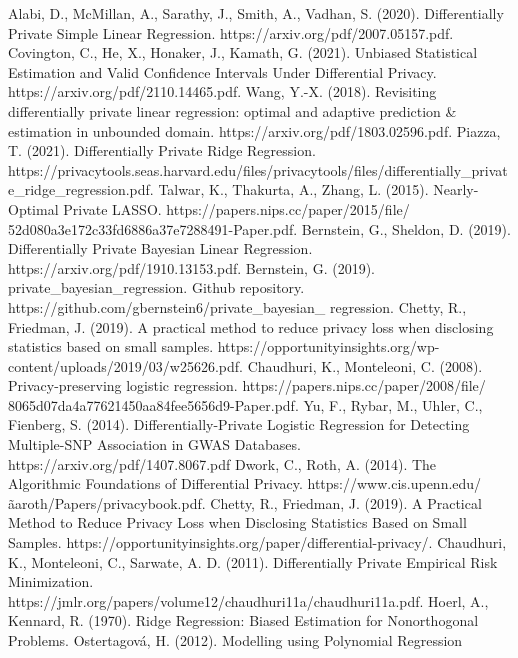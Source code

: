 \documentclass[11pt,conference]{IEEEtran}
\begin{document}
\begin{thebibliography}{00}
 Alabi, D., McMillan, A., Sarathy, J., Smith, A., Vadhan, S. (2020). Differentially Private Simple Linear Regression. https://arxiv.org/pdf/2007.05157.pdf. 
 Covington, C., He, X., Honaker, J., Kamath, G. (2021). Unbiased Statistical Estimation and Valid
Confidence Intervals Under Differential Privacy. https://arxiv.org/pdf/2110.14465.pdf. 
 Wang, Y.-X. (2018). Revisiting differentially private linear regression: optimal and adaptive prediction \& estimation in unbounded domain. https://arxiv.org/pdf/1803.02596.pdf. 
 Piazza, T. (2021). Differentially Private Ridge Regression. https://privacytools.seas.harvard.edu/files/privacytools/files/\-differentially\_private\_ridge\_regression.pdf.
 Talwar, K., Thakurta, A., Zhang, L. (2015). Nearly-Optimal Private LASSO. https://papers.nips.cc/paper/2015/file/ 52d080a3e172c33fd6886a37e7288491-Paper.pdf. 
 Bernstein, G., Sheldon, D. (2019). Differentially Private Bayesian Linear Regression. https://arxiv.org/pdf/1910.13153.pdf. 
 Bernstein, G. (2019). private\_bayesian\_regression. Github repository. https://github.com/gbernstein6/private\_bayesian\_ regression.
 Chetty, R., Friedman, J. (2019). A practical method to reduce privacy loss when disclosing statistics based on small samples. https://opportunityinsights.org/wp-content/uploads/2019/03/w25626.pdf. 
 Chaudhuri, K., Monteleoni, C. (2008). Privacy-preserving logistic regression. https://papers.nips.cc/paper/2008/file/ 8065d07da4a77621450aa84fee5656d9-Paper.pdf. 
 Yu, F., Rybar, M., Uhler, C., Fienberg, S. (2014). Differentially-Private Logistic Regression for
Detecting Multiple-SNP Association in GWAS
Databases. https://arxiv.org/pdf/1407.8067.pdf 
 Dwork, C., Roth, A. (2014). The Algorithmic Foundations of Differential Privacy. https://www.cis.upenn.edu/
\~aaroth/Papers/privacybook.pdf. 
 Chetty, R., Friedman, J. (2019). A Practical Method to Reduce Privacy Loss when Disclosing Statistics Based on Small Samples. https://opportunityinsights.org/paper/differential-privacy/. 
 Chaudhuri, K., Monteleoni, C., Sarwate, A. D. (2011). Differentially Private Empirical Risk Minimization. https://jmlr.org/papers/volume12/chaudhuri11a/chaudhuri11a.pdf. 
 Hoerl, A., Kennard, R. (1970). Ridge Regression: Biased Estimation for Nonorthogonal Problems.
 Ostertagová, H. (2012). Modelling using Polynomial Regression
\end{thebibliography}
\end{document}
